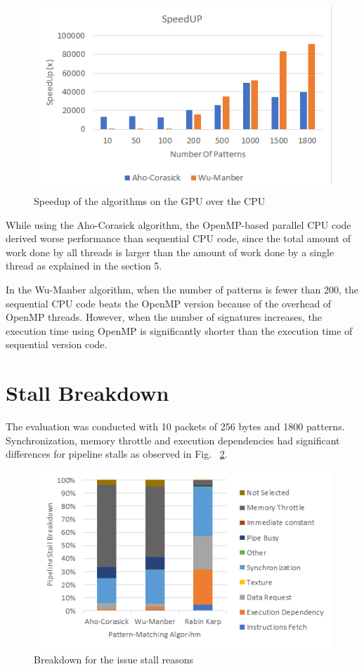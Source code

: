 \begin{figure}[H]
\centering
\includegraphics[width=12cm]{speedup.png}
\caption{Speedup of the algorithms on the GPU over the CPU}
\label{fig:speedup}
\end{figure}
\squeezeup
While using the Aho-Corasick algorithm, the OpenMP-based parallel CPU code derived worse performance than sequential CPU code, since the total amount of work done by all threads is larger than the amount of work done by a single thread as explained in the section 5.

In the Wu-Manber algorithm, when the number of patterns is fewer than 200, the sequential CPU code beats the OpenMP version because of the overhead of OpenMP threads. However, when the number of signatures increases, the execution time using OpenMP is significantly shorter than the execution time of sequential version code.

\section{Stall Breakdown}

The evaluation was conducted with 10 packets of 256 bytes and 1800 patterns. Synchronization, memory throttle and execution dependencies had significant differences for pipeline stalls as observed in Fig. ~\ref{fig:issuestallreasons}.

\begin{figure}[H]
	\centering
	\includegraphics[width=12cm]{issuestallreasons.png}
	\caption{Breakdown for the issue stall reasons}
	\label{fig:issuestallreasons}
\end{figure}
\squeezeup

